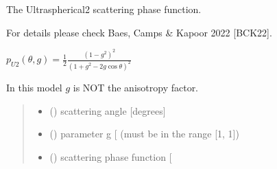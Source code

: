 \documentclass[letterpaper,10pt,english]{sphinxmanual}
\begin{document}
\begin{fulllineitems}
\label{\detokenize{06_anisotropy_factor:skinoptics.anisotropy_factor.ptheta_U2}}
\pysigstartsignatures
{}
\pysigstopsignatures
\begin{DUlineblock}{0em}
\item[] The Ultraspherical\sphinxhyphen{}2 scattering phase function.
\item[] For details please check Baes, Camps \& Kapoor 2022 {[}BCK22{]}.
\end{DUlineblock}

\sphinxAtStartPar
\(p_{U2}(\theta, g) = \frac{1}{2}\frac{(1 - g^2)^2}{(1 + g^2 - 2g \cos \theta)^2}\)

\begin{DUlineblock}{0em}
\item[] In this model \(g\) is NOT the anisotropy factor.
\end{DUlineblock}
\begin{quote}\begin{description}
\begin{itemize}
\item {} 
\sphinxAtStartPar
{} () \textendash{} scattering angle {[}degrees{]}

\item {} 
\sphinxAtStartPar
{} () \textendash{} parameter g {[}\sphinxhyphen{}{]} (must be in the range {[}\sphinxhyphen{}1, 1{]})

\end{itemize}

\sphinxAtStartPar
\begin{itemize}
\item {} 
\sphinxAtStartPar
{} () \textendash{} scattering phase function {[}\sphinxhyphen{}{]}

\end{itemize}


\end{description}\end{quote}

\end{fulllineitems}
\end{document}
